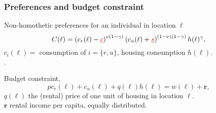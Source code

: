 \documentclass[aspectratio=169]{beamer}
\begin{document}
\begin{v75mins}
\begin{frame}[label=preference]
\frametitle{Preferences and budget constraint}
\begin{midi}
\item Non-homothetic preferences for an individual in location $\ell$
\begin{equation*}
C(\ell)=\left( c_r(\ell)-\re{\underline{c}}\right)^{\nu(1-\gamma)} \left(c_u(\ell) + \re{\underline{s}}\right) ^{(1-\nu)(1-\gamma)}h(\ell)^\gamma,
\end{equation*}
$c_i(\ell)=$ consumption of $i=\{r,u\}$, housing consumption $h(\ell)$.\\
.\\
\item Budget constraint,
\begin{equation*}
pc_r(\ell)+c_u(\ell)+q(\ell)h(\ell)=w(\ell)+\mathbf{r},
\end{equation*}
$q(\ell)$ the (rental) price of one unit of housing in location $\ell$.\\
$\mathbf{r}$ rental income per capita, equally distributed.
\end{midi}
\end{frame}
\end{v75mins}


\end{document}
